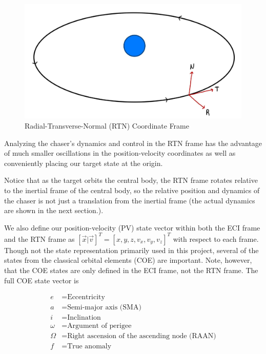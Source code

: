 \documentclass[conference]{IEEEtran}
\begin{document}
\begin{figure}[htbp]
    \centerline{\includegraphics[width=\linewidth]{./figures/rtn-frame.jpg}}
    \caption{Radial-Transverse-Normal (RTN) Coordinate Frame}
    \label{fig:rtn-frame}
\end{figure}

Analyzing the chaser's dynamics and control in the RTN frame has the advantage
of much smaller oscillations in the position-velocity coordinates as
well as conveniently placing our target state at the origin.

Notice that as the target orbits the central body, the RTN frame rotates
relative to the inertial frame of the central body, so the relative position
and dynamics of the chaser is not just a translation from the inertial frame
(the actual dynamics are shown in the next section.).

We also define our position-velocity (PV) state vector within both the ECI
frame and the RTN frame as $[\vec{x}|\vec{v}]^T=[x,y,z,v_x,v_y,v_z]^T$ with
respect to each frame. Though not the state representation primarily used in
this project, several of the states from the classical orbital elements (COE)
are important. Note, however, that the COE states are only defined in the ECI
frame, not the RTN frame. The full COE state vector is

\begin{equation}
    \label{eq:coes}
    \begin{split}
        e &= \text{Eccentricity} \\
        a &= \text{Semi-major axis (SMA)} \\
        i &= \text{Inclination} \\
        \omega &= \text{Argument of perigee} \\
        \Omega &= \text{Right ascension of the ascending node (RAAN)} \\
        f &= \text{True anomaly}
    \end{split}
\end{equation}
\end{document}
